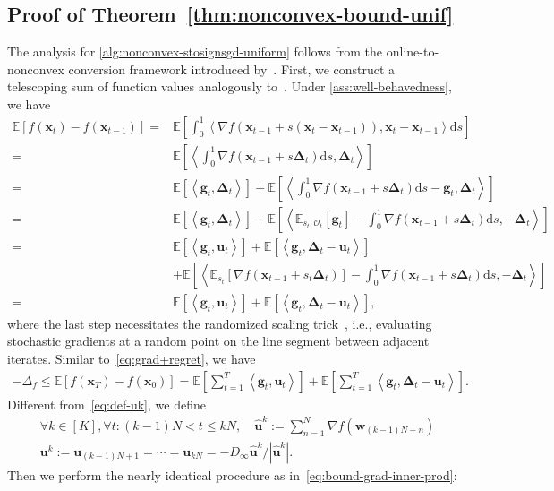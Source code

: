 \documentclass{article}
\def \E {\mathbb{E}}
\def \x {\mathbf{x}}
\def \g {\mathbf{g}}
\def \O {\mathcal{O}}
\def \u {\mathbf{u}}
\def \w {\mathbf{w}}
\def \uh {\widehat{\u}}
\def \diff {\mathrm{d}}
\newcommand{\inner}[2]{\left\langle #1, #2 \right\rangle}
\newcommand{\abs}[1]{\left|#1\right|}
\def \bDelta {\bm{\Delta}}
\newcommand{\sqbrac}[1]{\left[#1\right]}
\begin{document}
\subsection{Proof of Theorem~\ref{thm:nonconvex-bound-unif}\label{sec:proof-goldstein}}

The analysis for \cref{alg:nonconvex-stosignsgd-uniform} follows from the online-to-nonconvex conversion framework introduced by~\citet{cutkosky2023optimal}. First, we construct a telescoping sum of function values analogously to~\citet[Theorem~7]{cutkosky2023optimal}. Under \cref{ass:well-behavedness}, we have
\begin{align*}
    \E\sqbrac{f(\x_t)-f(\x_{t-1})}=&\E\sqbrac{\int_0^1\inner{\nabla f(\x_{t-1}+s(\x_t-\x_{t-1}))}{\x_t-\x_{t-1}}\diff{s}}\\=&\E\sqbrac{\inner{\int_0^1\nabla f(\x_{t-1}+s\bDelta_t)\diff{s}}{\bDelta_t}}\\=&\E\sqbrac{\inner{\g_t}{\bDelta_t}}+\E\sqbrac{\inner{\int_0^1\nabla f(\x_{t-1}+s\bDelta_t)\diff{s}-\g_t}{\bDelta_t}}\\=&\E\sqbrac{\inner{\g_t}{\bDelta_t}}+\E\sqbrac{\inner{\E_{s_t,\O_t}[\g_t]-\int_0^1\nabla f(\x_{t-1}+s\bDelta_t)\diff{s}}{-\bDelta_t}}\\=&\E\sqbrac{\inner{\g_t}{\u_t}}+\E\sqbrac{\inner{\g_t}{\bDelta_t-\u_t}}\\&+\E\sqbrac{\inner{\E_{s_t}[\nabla f(\x_{t-1}+s_t\bDelta_t)]-\int_0^1\nabla f(\x_{t-1}+s\bDelta_t)\diff{s}}{-\bDelta_t}}\\=&\E\sqbrac{\inner{\g_t}{\u_t}}+\E\sqbrac{\inner{\g_t}{\bDelta_t-\u_t}},
\end{align*}
where the last step necessitates the randomized scaling trick~\citep{zhang2020complexity}, i.e., evaluating stochastic gradients at a random point on the line segment between adjacent iterates. Similar to~\eqref{eq:grad+regret}, we have
\begin{align*}
    -\Delta_f\le\E\sqbrac{f(\x_T)-f(\x_0)}=\E\sqbrac{\sum_{t=1}^T\inner{\g_t}{\u_t}}+\E\sqbrac{\sum_{t=1}^T\inner{\g_t}{\bDelta_t-\u_t}}.
\end{align*}
Different from~\eqref{eq:def-uk}, we define
\begin{align}
    &\forall k\in[K],\forall t:(k-1)N<t\le kN,\quad\uh^k:=\sum_{n=1}^N\nabla f(\w_{(k-1)N+n})\\&\u^k:=\u_{(k-1)N+1}=\cdots=\u_{kN}=-D_\infty\uh^k/\abs{\uh^k}.
\end{align}
Then we perform the nearly identical procedure as in~\eqref{eq:bound-grad-inner-prod}:
\end{document}
